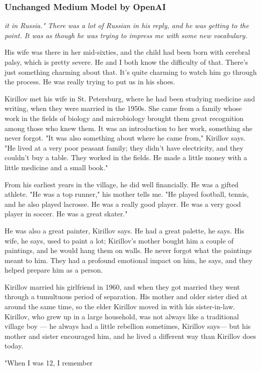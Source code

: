 \documentclass{scrartcl}
\begin{document}
\subsubsection{Unchanged Medium Model by OpenAI}
{\itshape
it in Russia." There was a lot of Russian in his reply, and he was getting to the point. It was as though he was trying to impress me with some new vocabulary.

His wife was there in her mid-sixties, and the child had been born with cerebral palsy, which is pretty severe. He and I both know the difficulty of that. There's just something charming about that. It's quite charming to watch him go through the process. He was really trying to put us in his shoes.

Kirillov met his wife in St. Petersburg, where he had been studying medicine and writing, when they were married in the 1950s. She came from a family whose work in the fields of biology and microbiology brought them great recognition among those who knew them. It was an introduction to her work, something she never forgot. "It was also something about where he came from," Kirillov says. "He lived at a very poor peasant family; they didn't have electricity, and they couldn't buy a table. They worked in the fields. He made a little money with a little medicine and a small book."

From his earliest years in the village, he did well financially. He was a gifted athlete. "He was a top runner," his mother tells me. "He played football, tennis, and he also played lacrosse. He was a really good player. He was a very good player in soccer. He was a great skater."

He was also a great painter, Kirillov says. He had a great palette, he says. His wife, he says, used to paint a lot; Kirillov's mother bought him a couple of paintings, and he would hang them on walls. He never forgot what the paintings meant to him. They had a profound emotional impact on him, he says, and they helped prepare him as a person.

Kirillov married his girlfriend in 1960, and when they got married they went through a tumultuous period of separation. His mother and older sister died at around the same time, so the elder Kirillov moved in with his sister-in-law. Kirillov, who grew up in a large household, was not always like a traditional village boy — he always had a little rebellion sometimes, Kirillov says— but his mother and sister encouraged him, and he lived a different way than Kirillov does today.

"When I was 12, I remember}
\end{document}
